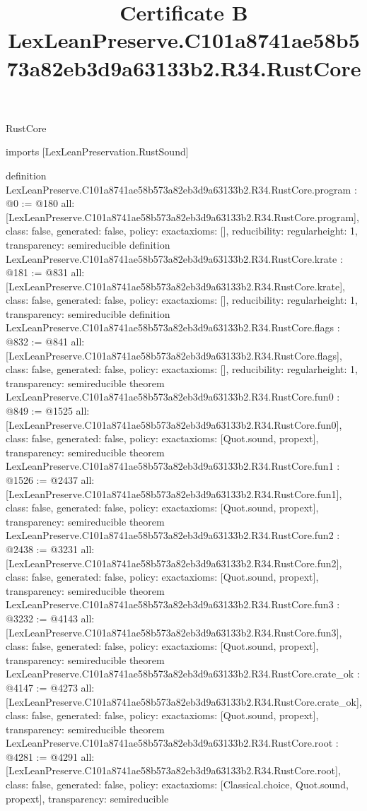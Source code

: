 \begin{lexlean}{RustCore}
\title{Certificate B LexLeanPreserve.C101a8741ae58b573a82eb3d9a63133b2.R34.RustCore}
\begin{coremodule}
imports [LexLeanPreservation.RustSound]

definition LexLeanPreserve.C101a8741ae58b573a82eb3d9a63133b2.R34.RustCore.program : @0 := @180 {
  all: [LexLeanPreserve.C101a8741ae58b573a82eb3d9a63133b2.R34.RustCore.program],
  class: false,
  generated: false,
  policy: exact{axioms: []},
  reducibility: regular{height: 1},
  transparency: semireducible
}
definition LexLeanPreserve.C101a8741ae58b573a82eb3d9a63133b2.R34.RustCore.krate : @181 := @831 {
  all: [LexLeanPreserve.C101a8741ae58b573a82eb3d9a63133b2.R34.RustCore.krate],
  class: false,
  generated: false,
  policy: exact{axioms: []},
  reducibility: regular{height: 1},
  transparency: semireducible
}
definition LexLeanPreserve.C101a8741ae58b573a82eb3d9a63133b2.R34.RustCore.flags : @832 := @841 {
  all: [LexLeanPreserve.C101a8741ae58b573a82eb3d9a63133b2.R34.RustCore.flags],
  class: false,
  generated: false,
  policy: exact{axioms: []},
  reducibility: regular{height: 1},
  transparency: semireducible
}
theorem LexLeanPreserve.C101a8741ae58b573a82eb3d9a63133b2.R34.RustCore.fun0 : @849 := @1525 {
  all: [LexLeanPreserve.C101a8741ae58b573a82eb3d9a63133b2.R34.RustCore.fun0],
  class: false,
  generated: false,
  policy: exact{axioms: [Quot.sound, propext]},
  transparency: semireducible
}
theorem LexLeanPreserve.C101a8741ae58b573a82eb3d9a63133b2.R34.RustCore.fun1 : @1526 := @2437 {
  all: [LexLeanPreserve.C101a8741ae58b573a82eb3d9a63133b2.R34.RustCore.fun1],
  class: false,
  generated: false,
  policy: exact{axioms: [Quot.sound, propext]},
  transparency: semireducible
}
theorem LexLeanPreserve.C101a8741ae58b573a82eb3d9a63133b2.R34.RustCore.fun2 : @2438 := @3231 {
  all: [LexLeanPreserve.C101a8741ae58b573a82eb3d9a63133b2.R34.RustCore.fun2],
  class: false,
  generated: false,
  policy: exact{axioms: [Quot.sound, propext]},
  transparency: semireducible
}
theorem LexLeanPreserve.C101a8741ae58b573a82eb3d9a63133b2.R34.RustCore.fun3 : @3232 := @4143 {
  all: [LexLeanPreserve.C101a8741ae58b573a82eb3d9a63133b2.R34.RustCore.fun3],
  class: false,
  generated: false,
  policy: exact{axioms: [Quot.sound, propext]},
  transparency: semireducible
}
theorem LexLeanPreserve.C101a8741ae58b573a82eb3d9a63133b2.R34.RustCore.crate_ok : @4147 := @4273 {
  all: [LexLeanPreserve.C101a8741ae58b573a82eb3d9a63133b2.R34.RustCore.crate_ok],
  class: false,
  generated: false,
  policy: exact{axioms: [Quot.sound, propext]},
  transparency: semireducible
}
theorem LexLeanPreserve.C101a8741ae58b573a82eb3d9a63133b2.R34.RustCore.root : @4281 := @4291 {
  all: [LexLeanPreserve.C101a8741ae58b573a82eb3d9a63133b2.R34.RustCore.root],
  class: false,
  generated: false,
  policy: exact{axioms: [Classical.choice, Quot.sound, propext]},
  transparency: semireducible
}


\end{coremodule}
\end{lexlean}
